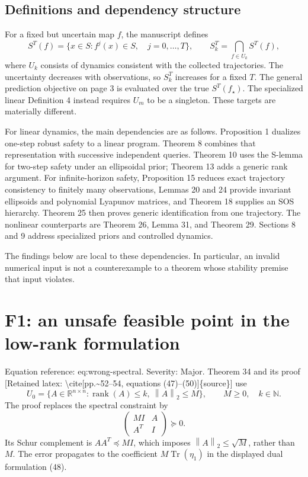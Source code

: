 \documentclass[10pt]{article}
\begin{document}
\subsection*{Definitions and dependency structure}
For a fixed but uncertain map \(f\), the manuscript defines \[S^T(f)=\{x\in S:f^j(x)\in S,\quad j=0,\ldots,T\},
 \qquad S_k^T=\bigcap_{f\in U_k}S^T(f),\] where \(U_k\) consists of dynamics consistent with the collected trajectories. The uncertainty decreases with observations, so \(S_k^T\) increases for a fixed \(T\). The general prediction objective on page 3 is evaluated over the true \(S^T(f_\star)\). The specialized linear Definition 4 instead requires \(U_m\) to be a singleton. These targets are materially different.\par
For linear dynamics, the main dependencies are as follows. Proposition 1 dualizes one-step robust safety to a linear program. Theorem 8 combines that representation with successive independent queries. Theorem 10 uses the S-lemma for two-step safety under an ellipsoidal prior; Theorem 13 adds a generic rank argument. For infinite-horizon safety, Proposition 15 reduces exact trajectory consistency to finitely many observations, Lemmas 20 and 24 provide invariant ellipsoids and polynomial Lyapunov matrices, and Theorem 18 supplies an SOS hierarchy. Theorem 25 then proves generic identification from one trajectory. The nonlinear counterparts are Theorem 26, Lemma 31, and Theorem 29. Sections 8 and 9 address specialized priors and controlled dynamics.\par
The findings below are local to these dependencies. In particular, an invalid numerical input is not a counterexample to a theorem whose stability premise that input violates.\par
\section*{F1: an unsafe feasible point in the low-rank formulation}
Equation reference: eq:wrong-spectral. Severity: Major. Theorem 34 and its proof [Retained latex: \textbackslash{}cite[pp.\textasciitilde{}52--54, equations (47)--(50)]\{source\}] use \[U_0=\{A\in\mathbb R^{n\times n}:\operatorname{rank}(A)\le k,\ \left\lVert A\right\rVert_2\le M\},
 \qquad M\ge0,\quad k\in\mathbb N.\] The proof replaces the spectral constraint by \[\begin{pmatrix}MI&A\\A^T&I\end{pmatrix}\succeq0.
 \] Its Schur complement is \(AA^T\preceq MI\), which imposes \(\left\lVert A\right\rVert_2\le\sqrt M\), rather than \(M\). The error propagates to the coefficient \(M\operatorname{Tr}(\eta_1)\) in the displayed dual formulation (48).\par
\end{document}
